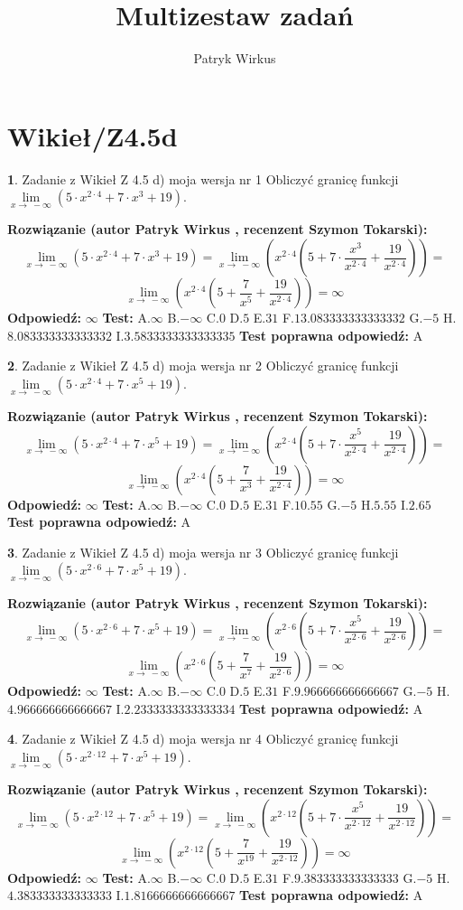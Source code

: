 \documentclass[12pt, a4paper]{article}
\title{Multizestaw zadań}
\author{Patryk Wirkus}
\date{}
\theoremstyle{definition} %
\newtheorem{zad}{}
\newcommand{\kategoria}[1]{\section{#1}}
\newcommand{\zadStart}[1]{\begin{zad}#1\newline}
\newcommand{\zadStop}{\end{zad}}
\newcommand{\rozwStart}[2]{\noindent \textbf{Rozwiązanie (autor #1 , recenzent #2): }\newline}
\newcommand{\rozwStop}{\newline}
\newcommand{\odpStart}{\noindent \textbf{Odpowiedź:}\newline}
\newcommand{\odpStop}{\newline}
\newcommand{\testStart}{\noindent \textbf{Test:}\newline}
\newcommand{\testStop}{\newline}
\newcommand{\kluczStart}{\noindent \textbf{Test poprawna odpowiedź:}\newline}
\newcommand{\kluczStop}{\newline}
\begin{document}
\maketitle

\kategoria{Wikieł/Z4.5d}


\zadStart{Zadanie z Wikieł Z 4.5 d) moja wersja nr 1}
Obliczyć granicę funkcji  $\lim\limits_{x\to\ -\infty}(5 \cdot x^{2\cdot4}+7 \cdot x^{3}+19)$.
\zadStop
\rozwStart{Patryk Wirkus}{Szymon Tokarski}
$$\lim\limits_{x\to\ -\infty}(5 \cdot x^{2\cdot4}+7 \cdot x^{3}+19) = \lim\limits_{x\to\ -\infty}(x^{2\cdot4}(5 +7 \cdot \frac{x^{3}}{x^{2\cdot4}}+\frac{19}{x^{2\cdot4}})) =$$ $$\lim\limits_{x\to\ -\infty}(x^{2\cdot4}(5 +\frac{7}{x^{5}}+\frac{19}{x^{2\cdot4}})) =\infty$$
\rozwStop
\odpStart
$\infty$
\odpStop
\testStart
A.$\infty$ B.$-\infty$ C.$0$ D.$5$ E.$31$
F.$13.083333333333332$ G.$-5$
H.$8.083333333333332$
I.$3.5833333333333335$
\testStop
\kluczStart
A
\kluczStop



\zadStart{Zadanie z Wikieł Z 4.5 d) moja wersja nr 2}
Obliczyć granicę funkcji  $\lim\limits_{x\to\ -\infty}(5 \cdot x^{2\cdot4}+7 \cdot x^{5}+19)$.
\zadStop
\rozwStart{Patryk Wirkus}{Szymon Tokarski}
$$\lim\limits_{x\to\ -\infty}(5 \cdot x^{2\cdot4}+7 \cdot x^{5}+19) = \lim\limits_{x\to\ -\infty}(x^{2\cdot4}(5 +7 \cdot \frac{x^{5}}{x^{2\cdot4}}+\frac{19}{x^{2\cdot4}})) =$$ $$\lim\limits_{x\to\ -\infty}(x^{2\cdot4}(5 +\frac{7}{x^{3}}+\frac{19}{x^{2\cdot4}})) =\infty$$
\rozwStop
\odpStart
$\infty$
\odpStop
\testStart
A.$\infty$ B.$-\infty$ C.$0$ D.$5$ E.$31$
F.$10.55$ G.$-5$
H.$5.55$
I.$2.65$
\testStop
\kluczStart
A
\kluczStop



\zadStart{Zadanie z Wikieł Z 4.5 d) moja wersja nr 3}
Obliczyć granicę funkcji  $\lim\limits_{x\to\ -\infty}(5 \cdot x^{2\cdot6}+7 \cdot x^{5}+19)$.
\zadStop
\rozwStart{Patryk Wirkus}{Szymon Tokarski}
$$\lim\limits_{x\to\ -\infty}(5 \cdot x^{2\cdot6}+7 \cdot x^{5}+19) = \lim\limits_{x\to\ -\infty}(x^{2\cdot6}(5 +7 \cdot \frac{x^{5}}{x^{2\cdot6}}+\frac{19}{x^{2\cdot6}})) =$$ $$\lim\limits_{x\to\ -\infty}(x^{2\cdot6}(5 +\frac{7}{x^{7}}+\frac{19}{x^{2\cdot6}})) =\infty$$
\rozwStop
\odpStart
$\infty$
\odpStop
\testStart
A.$\infty$ B.$-\infty$ C.$0$ D.$5$ E.$31$
F.$9.966666666666667$ G.$-5$
H.$4.966666666666667$
I.$2.2333333333333334$
\testStop
\kluczStart
A
\kluczStop



\zadStart{Zadanie z Wikieł Z 4.5 d) moja wersja nr 4}
Obliczyć granicę funkcji  $\lim\limits_{x\to\ -\infty}(5 \cdot x^{2\cdot12}+7 \cdot x^{5}+19)$.
\zadStop
\rozwStart{Patryk Wirkus}{Szymon Tokarski}
$$\lim\limits_{x\to\ -\infty}(5 \cdot x^{2\cdot12}+7 \cdot x^{5}+19) = \lim\limits_{x\to\ -\infty}(x^{2\cdot12}(5 +7 \cdot \frac{x^{5}}{x^{2\cdot12}}+\frac{19}{x^{2\cdot12}})) =$$ $$\lim\limits_{x\to\ -\infty}(x^{2\cdot12}(5 +\frac{7}{x^{19}}+\frac{19}{x^{2\cdot12}})) =\infty$$
\rozwStop
\odpStart
$\infty$
\odpStop
\testStart
A.$\infty$ B.$-\infty$ C.$0$ D.$5$ E.$31$
F.$9.383333333333333$ G.$-5$
H.$4.383333333333333$
I.$1.8166666666666667$
\testStop
\kluczStart
A
\kluczStop
\end{document}
